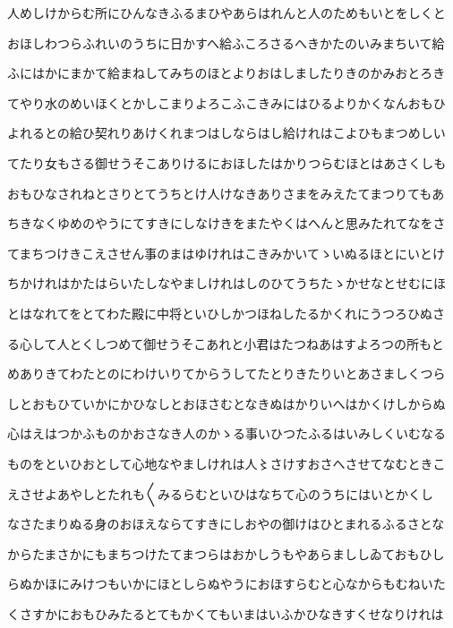 \documentclass[a4paper,11pt,landscape]{ltjtarticle}
\begin{document}
\par\medskip
人めしけからむ所にひんなきふるまひやあらはれんと人のためもいとをしくと
\par\medskip
おほしわつらふれいのうちに日かすへ給ふころさるへきかたのいみまちいて給
\par\medskip
ふにはかにまかて給まねしてみちのほとよりおはしましたりきのかみおとろき
\par\medskip
てやり水のめいほくとかしこまりよろこふこきみにはひるよりかくなんおもひ
\par\medskip
よれるとの給ひ契れりあけくれまつはしならはし給けれはこよひもまつめしい
\par\medskip
てたり女もさる御せうそこありけるにおほしたはかりつらむほとはあさくしも
\par\medskip
おもひなされねとさりとてうちとけ人けなきありさまをみえたてまつりてもあ
\par\medskip
ちきなくゆめのやうにてすきにしなけきをまたやくはへんと思みたれてなをさ
\par\medskip
てまちつけきこえさせん事のまはゆけれはこきみかいてゝいぬるほとにいとけ
\par\medskip
ちかけれはかたはらいたしなやましけれはしのひてうちたゝかせなとせむにほ
\par\medskip
とはなれてをとてわた殿に中将といひしかつほねしたるかくれにうつろひぬさ
\par\medskip
る心して人とくしつめて御せうそこあれと小君はたつねあはすよろつの所もと
\par\medskip
めありきてわたとのにわけいりてからうしてたとりきたりいとあさましくつら
\par\medskip
しとおもひていかにかひなしとおほさむとなきぬはかりいへはかくけしからぬ
\par\medskip
心はえはつかふものかおさなき人のかゝる事いひつたふるはいみしくいむなる
\par\medskip
ものをといひおとして心地なやましけれは人〻さけすおさへさせてなむときこ
\par\medskip
えさせよあやしとたれも〱みるらむといひはなちて心のうちにはいとかくし
\par\medskip
なさたまりぬる身のおほえならてすきにしおやの御けはひとまれるふるさとな
\par\medskip
からたまさかにもまちつけたてまつらはおかしうもやあらまししゐておもひし
\par\medskip
らぬかほにみけつもいかにほとしらぬやうにおほすらむと心なからもむねいた
\par\medskip
くさすかにおもひみたるとてもかくてもいまはいふかひなきすくせなりけれは
\end{document}
